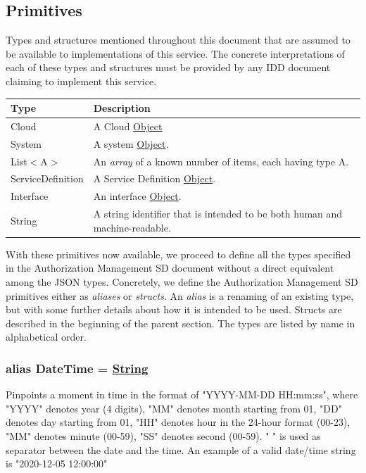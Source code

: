 \documentclass[a4paper]{arrowhead}
\newcommand{\pdef}[1]{{\textcolor{ArrowheadGrey}{#1\label{sec:model:primitives:#1}\label{sec:model:primitives:#1s}\label{sec:model:primitives:#1es}}}}
\newcommand{\pref}[1]{{\textcolor{ArrowheadGrey}{\hyperref[sec:model:primitives:#1]{#1}}}}
\begin{document}
\subsection{Primitives}
\label{sec:model:primitives}

Types and structures mentioned throughout this document that are assumed to be available to implementations of this service.
The concrete interpretations of each of these types and structures must be provided by any IDD document claiming to implement this service.

\begin{table}[ht!]
\begin{tabularx}{\textwidth}{| p{3cm} | X |} \hline
\rowcolor{gray!33} Type & Description \\ \hline
\pdef{Cloud}        & A Cloud \pref{Object} \\ \hline
\pdef{System}               & A system \pref{Object}. \\ \hline
\pdef{List}$<$A$>$      & An \textit{array} of a known number of items, each having type A. \\ \hline
\pdef{ServiceDefinition} & A Service Definition \pref{Object}. \\ \hline
\pdef{Interface} & An interface \pref{Object}. \\ \hline
\pdef{String}             & A string identifier that is intended to be both human and machine-readable. \\ \hline
\end{tabularx}
\end{table}

With these primitives now available, we proceed to define all the types specified in the Authorization Management SD document without a direct equivalent among the JSON types.
Concretely, we define the Authorization Management SD primitives either as \textit{aliases} or \textit{structs}.
An \textit{alias} is a renaming of an existing type, but with some further details about how it is intended to be used.
Structs are described in the beginning of the parent section.
The types are listed by name in alphabetical order.

\subsubsection{alias \pdef{DateTime} = \pref{String}}

Pinpoints a moment in time in the format of "YYYY-MM-DD HH:mm:ss", where "YYYY" denotes year (4 digits), "MM" denotes month starting from 01, "DD" denotes day starting from 01, "HH" denotes hour in the 24-hour format (00-23), "MM" denotes minute (00-59), "SS" denotes second (00-59). " " is used as separator between the date and the time.
An example of a valid date/time string is "2020-12-05 12:00:00"
\end{document}
